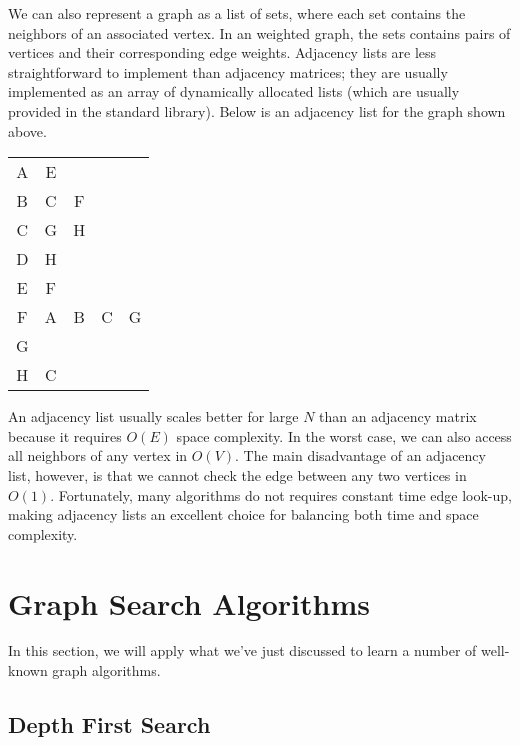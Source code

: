 We can also represent a graph as a list of sets, where each set contains the neighbors of an associated vertex. In an weighted graph, the sets contains pairs of vertices and their corresponding edge weights. Adjacency lists are less straightforward to implement than adjacency matrices; they are usually implemented as an array of dynamically allocated lists (which are usually provided in the standard library). Below is an adjacency list for the graph shown above. 

\begin{center}
\begin{minipage}{0.45\linewidth}
\begin{tabular}{ c|c c c c}
A        & E \\
B        & C & F \\
C        & G & H \\
D        & H \\
E        & F \\
F        & A & B & C & G \\
G        & \\
H        & C \\
\end{tabular}
\end{minipage}
\end{center}

An adjacency list usually scales better for large $N$ than an adjacency matrix because it requires $O(E)$ space complexity. In the worst case, we can also access all neighbors of any vertex in $O(V)$. The main disadvantage of an adjacency list, however, is that we cannot check the edge between any two vertices in $O(1)$. Fortunately, many algorithms do not requires constant time edge look-up, making adjacency lists an excellent choice for balancing both time and space complexity. 


\section{Graph Search Algorithms}

In this section, we will apply what we've just discussed to learn a number of well-known graph algorithms. 

\begin{comment}
Proceed to copy paste from SCT lectures. 
\end{comment}

\subsection{Depth First Search}

